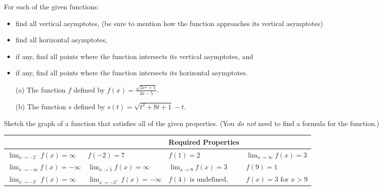 \documentclass[handout,nooutcomes]{ximera}
\begin{document}
\begin{problem}
  \label{problem:asymptotes}
    For each of the given functions:
  \begin{itemize}
    \item
      find all vertical asymptotes, (be sure to mention how the function approaches its vertical asymptotes)
    \item
      find all horizontal asymptotes,
    \item
      if any, find all points where the function intersects its vertical asymptotes, and
    \item
      if any, find all points where the function intersects its horizontal asymptotes.
  \end{itemize}
  \begin{itemize}
    \item[(a)] The function $f$ defined by $\displaystyle f(x) = \frac{\sqrt{2x^2 + 1}}{3x-5}$.

    \item[(b)] The function $s$ defined by $\displaystyle s(t) = \sqrt{t^2 + 8t + 1} - t$.
  \end{itemize}
\end{problem}

\begin{problem}
  \label{problem:sketch-a-graph}
  Sketch the graph of a function that satisfies all of the given properties.
  (You \emph{do not} need to find a formula for the function.)

  \begin{center}
    \begin{tabular}[c]{llll}
      \toprule
      & & \hspace{-5em}Required Properties\\
      \midrule
      $\displaystyle \lim_{x \to -2^-} f(x) = \infty$ & $f(-2) = 7$ & $f(1) = 2$ & $\displaystyle \lim_{x \to \infty} f(x) = 3$ \\
      $\displaystyle \lim_{x \to -\infty} f(x) = -\infty$ & $\lim_{x \to 5} f(x) = \infty$ & $\displaystyle \lim_{x \to 9} f(x) = 3$ & $f(9) = 1$\\
      $\displaystyle \lim_{x \to -3^-} f(x) = \infty$ & $\displaystyle \lim_{x \to -3^+} f(x) = -\infty$ & $f(4) \text{ is undefined, }$ & $f(x) = 3 \text{ for } x>9$\\
      \bottomrule
    \end{tabular}
  \end{center}
\end{problem}
\end{document}
